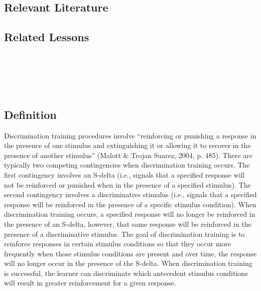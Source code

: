 \subsection{Relevant Literature}
\begin{refsection}
\nocite{michael1982distinguishing,
        skinner1953science,
        smith1997antecedent}
\printbibliography[heading=none]
\end{refsection}
%
\subsection{Related Lessons} 
\foureNine{}\\
\fourFKTwentySix{}\\
\fourFKTwentySeven{}\\
\fourFKTwentyNine{}\\
%
\subsection{Definition}
Discrimination training procedures involve ``reinforcing or punishing a response in the presence of one stimulus and extinguishing it or allowing it to recover in the presence of another stimulus'' (Malott \& Trojan Suarez, 2004, p. 485). There are typically two competing contingencies when discrimination training occurs.  The first contingency involves an S-delta (i.e., signals that a specified response will not be reinforced or punished when in the presence of a specified stimulus). The second contingency involves a discriminative stimulus (i.e., signals that a specified response will be reinforced in the presence of a specific stimulus condition). When discrimination training occurs, a specified response will no longer be reinforced in the presence of an S-delta, however, that same response will be reinforced in the presence of a discriminative stimulus. The goal of discrimination training is to reinforce responses in certain stimulus conditions so that they occur more frequently when those stimulus conditions are present and over time, the response will no longer occur in the presence of the S-delta. When discrimination training is successful, the learner can discriminate which antecedent stimulus conditions will result in greater reinforcement for a given response. 
%

